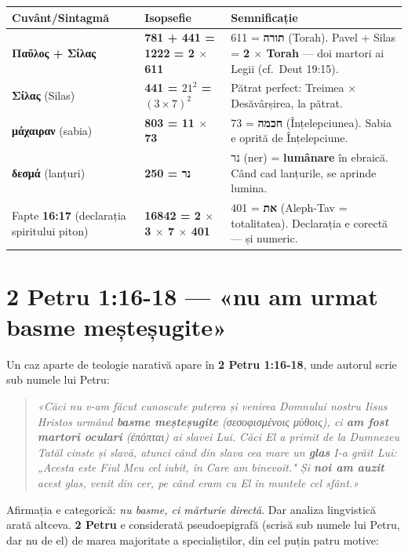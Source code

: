 \documentclass[12pt,a4paper,twoside,openany]{book}
\begin{document}
\begin{center}
\small
\begin{tabular}{L{4cm}C{3cm}L{6cm}}
\toprule
{}
\textbf{Cuvânt/Sintagmă} & \textbf{Isopsefie} & \textbf{Semnificație} \\
\midrule
\textbf{Παῦλος + Σίλας} & \textbf{\textcolor{primary}{781 + 441 = 1222 = 2 $\times$ 611}} & 611 = \textbf{תורה} (Torah). Pavel + Silas = \textbf{2 $\times$ Torah} --- doi martori ai Legii (cf.\ Deut 19:15). \\
\textbf{Σίλας} (Silas) & \textbf{\textcolor{primary}{441 = $21^2$ = $(3 \times 7)^2$}} & Pătrat perfect: Treimea $\times$ Desăvârșirea, la pătrat. \\
\textbf{μάχαιραν} (sabia) & \textbf{\textcolor{primary}{803 = 11 $\times$ 73}} & 73 = \textbf{חכמה} (Înțelepciunea). Sabia e oprită de Înțelepciune. \\
\textbf{δεσμά} (lanțuri) & \textbf{\textcolor{primary}{250 = נר}} & נר (ner) = \textbf{lumânare} în ebraică. Când cad lanțurile, se aprinde lumina. \\
Fapte \textbf{16:17} (declarația spiritului piton) & \textbf{\textcolor{primary}{16842 = 2 $\times$ 3 $\times$ 7 $\times$ 401}} & 401 = \textbf{את} (Aleph-Tav = totalitatea). Declarația e corectă --- și numeric. \\
\bottomrule
\end{tabular}
\end{center}
\normalsize


\section{2 Petru 1:16-18 --- «nu am urmat basme meșteșugite»}

Un caz aparte de teologie narativă apare în \textbf{2 Petru 1:16-18}, unde autorul scrie sub numele lui Petru:

\begin{quote}
\textit{«Căci nu v-am făcut cunoscute puterea și venirea Domnului nostru Iisus Hristos urmând \textbf{basme meșteșugite} (σεσοφισμένοις μύθοις), ci \textbf{am fost martori oculari} (ἐπόπται) ai slavei Lui. Căci El a primit de la Dumnezeu Tatăl cinste și slavă, atunci când din slava cea mare un \textbf{glas} I-a grăit Lui: „Acesta este Fiul Meu cel iubit, în Care am binevoit." Și \textbf{noi am auzit} acest glas, venit din cer, pe când eram cu El în muntele cel sfânt.»}
\end{quote}

Afirmația e categorică: \textit{nu basme, ci mărturie directă}. Dar analiza lingvistică arată altceva. \textbf{2 Petru} e considerată pseudoepigrafă (scrisă sub numele lui Petru, dar nu de el) de marea majoritate a specialiștilor, din cel puțin patru motive:
\end{document}
